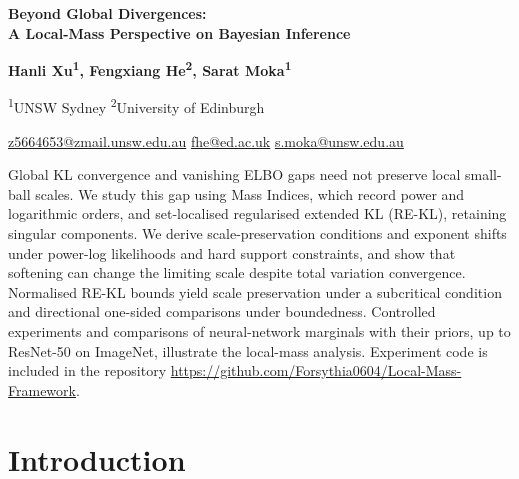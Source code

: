 \documentclass[11pt,a4paper]{article}
\theoremstyle{compactplain}
\theoremstyle{compactdefinition}
\numberwithin{equation}{section}
\begin{document}
\thispagestyle{firstpage}
\noindent{\color{rulegray}\rule{\linewidth}{0.6pt}}\par
\vspace{10pt}
{\raggedright\parindent=0pt
{\fontsize{20}{24}\selectfont\bfseries
Beyond Global Divergences:\\
A Local-Mass Perspective on Bayesian Inference\par}
\vspace{11pt}
{\normalsize\bfseries
Hanli Xu\textsuperscript{1},\enspace
Fengxiang He\textsuperscript{2},\enspace
Sarat Moka\textsuperscript{1}\par}
\vspace{3pt}
{\small\sffamily
\textsuperscript{1}UNSW Sydney \quad
\textsuperscript{2}University of Edinburgh\par
\href{mailto:z5664653@zmail.unsw.edu.au}{z5664653@zmail.unsw.edu.au}\quad
\href{mailto:fhe@ed.ac.uk}{fhe@ed.ac.uk}\quad
\href{mailto:s.moka@unsw.edu.au}{s.moka@unsw.edu.au}\par}
}

\vspace{15pt}
{\setlength{\parindent}{0pt}\noindent
Global KL convergence and vanishing ELBO gaps need not preserve local small-ball scales. We study this gap using Mass Indices, which record power and logarithmic orders, and set-localised regularised extended KL (RE-KL), retaining singular components. We derive scale-preservation conditions and exponent shifts under power-log likelihoods and hard support constraints, and show that softening can change the limiting scale despite total variation convergence. Normalised RE-KL bounds yield scale preservation under a subcritical condition and directional one-sided comparisons under boundedness. Controlled experiments and comparisons of neural-network marginals with their priors, up to ResNet-50 on ImageNet, illustrate the local-mass analysis. Experiment code is included in the repository \url{https://github.com/Forsythia0604/Local-Mass-Framework}.
\par}
\vspace{4pt}

\section{Introduction}
\end{document}
